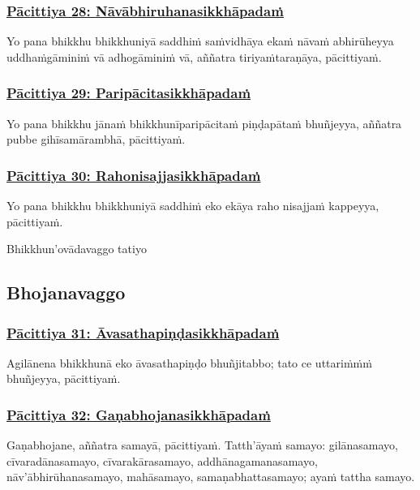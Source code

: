 \subsubsection*{\hyperref[exp28]{Pācittiya 28: Nāvābhiruhanasikkhāpadaṁ}}
\label{pac28}
Yo pana bhikkhu bhikkhuniyā saddhiṁ saṁvidhāya ekaṁ nāvaṁ abhirūheyya uddhaṁgāminiṁ vā adhogāminiṁ vā, aññatra tiriyaṁtaraṇāya, pācittiyaṁ.

\subsubsection*{\hyperref[exp29]{Pācittiya 29: Paripācitasikkhāpadaṁ}}
\label{pac29}
Yo pana bhikkhu jānaṁ bhikkhunīparipācitaṁ piṇḍapātaṁ bhuñjeyya, aññatra pubbe gihīsamārambhā, pācittiyaṁ.

\subsubsection*{\hyperref[exp30]{Pācittiya 30: Rahonisajjasikkhāpadaṁ}}
\label{pac30}
Yo pana bhikkhu bhikkhuniyā saddhiṁ eko ekāya raho nisajjaṁ kappeyya, pācittiyaṁ.

\begin{center}
  Bhikkhun'ovādavaggo tatiyo
\end{center}

\subsection{Bhojanavaggo}
\vspace{0.2cm}

\subsubsection*{\hyperref[exp31]{Pācittiya 31: Āvasathapiṇḍasikkhāpadaṁ}}
\label{pac31}
Agilānena bhikkhunā eko āvasathapiṇḍo bhuñjitabbo; tato ce uttariṁṁṁ bhuñjeyya, pācittiyaṁ.

\subsubsection*{\hyperref[exp32]{Pācittiya 32: Gaṇabhojanasikkhāpadaṁ}}
\label{pac32}
Gaṇabhojane, aññatra samayā, pācittiyaṁ. Tatth'āyaṁ samayo: gilānasamayo, cīvaradānasamayo, cīvarakārasamayo, addhānagamanasamayo, nāv'ābhirūhanasamayo, mahāsamayo, samaṇabhattasamayo; ayaṁ tattha samayo.

